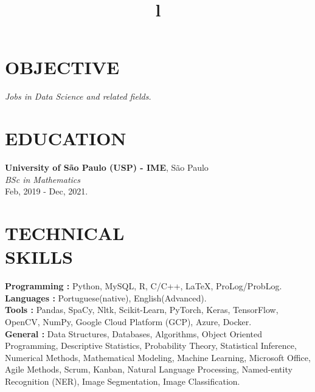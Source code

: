 \documentclass[margin]{res}
\begin{document}
\begin{resume}

\section{OBJECTIVE}
{\sl Jobs in Data Science and related fields. }

\section{EDUCATION}
\textbf{University of S\~ao Paulo (USP) - IME}, S\~ao Paulo\\
{\sl BSc in Mathematics} \\
Feb, 2019 - Dec, 2021.
 

\section{TECHNICAL\\SKILLS}

\textbf{Programming : } Python, MySQL, R, C/C++, \LaTeX , ProLog/ProbLog.
\\
\textbf{ Languages : } Portuguese(native), English(Advanced). 
\\
\textbf{Tools : } Pandas, SpaCy, Nltk, Scikit-Learn, PyTorch, Keras, TensorFlow, OpenCV, NumPy, Google Cloud Platform (GCP), Azure, Docker. 
\\
\textbf{General :} Data Structures, Databases, Algorithms, Object Oriented Programming, Descriptive Statistics, Probability Theory, Statistical Inference, Numerical Methods, Mathematical Modeling, Machine Learning, Microsoft Office, Agile Methods, Scrum, Kanban, Natural Language Processing, Named-entity Recognition (NER), Image Segmentation, Image Classification.

\begin{format}
\title{l}\\
\\
\body\\
\end{format}


\end{resume}
\end{document}

